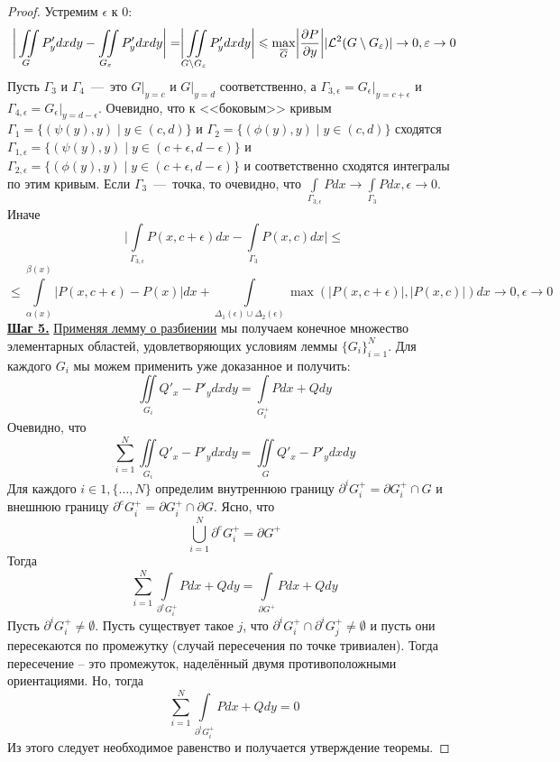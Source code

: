 \begin{proof}
    Устремим $\epsilon$ к 0: \[\biggr|\iint\limits_G P'_ydxdy - \iint\limits_{G_{\varepsilon}} P'_ydxdy\biggr| = \biggr|\iint\limits_{G \setminus G_{\varepsilon}}P'_ydxdy\biggr| \leqslant \max\limits_{\overline{G}}\biggr|\dfrac{\partial P}{\partial y}\biggr||\mathcal{L}^2(G \setminus G_{\varepsilon})| \rightarrow 0, \varepsilon \rightarrow 0\]
    Пусть $\Gamma_3$ и $\Gamma_4$~---~это $G|_{y = c}$ и $G|_{y = d}$ соответственно, а $\Gamma_{3, \epsilon} = G_\epsilon|_{y = c + \epsilon}$ и $\Gamma_{4, \epsilon} = G_\epsilon|_{y = d - \epsilon}$. Очевидно, что к <<боковым>> кривым $\Gamma_1 = \{(\psi(y), y) \mid y \in (c, d)\}$ и $\Gamma_2 = \{(\phi(y), y) \mid y \in (c, d)\}$ сходятся $\Gamma_{1, \epsilon} = \{(\psi(y), y) \mid y \in (c + \epsilon, d - \epsilon)\}$ и $\Gamma_{2, \epsilon} = \{(\phi(y), y) \mid y \in (c + \epsilon, d - \epsilon)\}$ и соответственно сходятся интегралы по этим кривым. Если $\Gamma_3$~---~точка, то очевидно, что $\int\limits_{\Gamma_{3, \epsilon}} Pdx \rightarrow \int\limits_{\Gamma_{3}} Pdx, \epsilon \rightarrow 0$. Иначе \[\biggr|\int\limits_{\Gamma_{3, \epsilon}}P(x, c + \epsilon)dx - \int\limits_{\Gamma_3}P(x, c)dx\biggr| \leq \]\[ \leq \int\limits_{\alpha(x)}^{\beta(x)} |P(x, c + \epsilon) - P(x)|dx + \int\limits_{\Delta_1(\epsilon) \cup \Delta_2(\epsilon)} \max(|P(x, c + \epsilon)|, |P(x, c)|)dx \rightarrow 0, \epsilon \rightarrow 0\]
    \textbf{\underline{Шаг 5.}} \hyperlink{lemma_8_6}{Применяя лемму о разбиении} мы получаем конечное множество элементарных областей, удовлетворяющих условиям леммы $\{G_i\}_{i = 1}^N$. Для каждого $G_i$ мы можем применить уже доказанное и получить: \[\iint\limits_{G_i} Q'_x - P'_ydxdy = \int\limits_{G_i^+} Pdx+Qdy\]
    Очевидно, что \[\sum\limits_{i = 1}^N \iint\limits_{G_i} Q'_x - P'_ydxdy = \iint\limits_G Q'_x - P'_ydxdy\]
    Для каждого $i \in 1, \{\ldots, N\}$ определим внутреннюю границу $\partial^iG_i^+ = \partial G_i^+ \cap G$ и внешнюю границу $\partial^e G_i^+ = \partial G_i^+ \cap \partial G$. Ясно, что \[\bigcup\limits_{i = 1}^N \partial^e G_i^+ = \partial G^+\]
    Тогда \[\sum\limits_{i = 1}^N \int\limits_{\partial^e G_i^+} Pdx + Qdy = \int\limits_{\partial G^+} Pdx + Qdy\]
    Пусть $\partial^i G_i^+ \neq \emptyset$. Пусть существует такое $j$, что $\partial^iG_i^+ \cap \partial^i G_j^+ \neq \emptyset$ и пусть они пересекаются по промежутку (случай пересечения по точке тривиален). Тогда пересечение -- это промежуток, наделённый двумя противоположными ориентациями. Но, тогда \[\sum\limits_{i = 1}^N \int\limits_{\partial^i G_i^+} Pdx + Qdy = 0\]
    Из этого следует необходимое равенство и получается утверждение теоремы.

\end{proof}